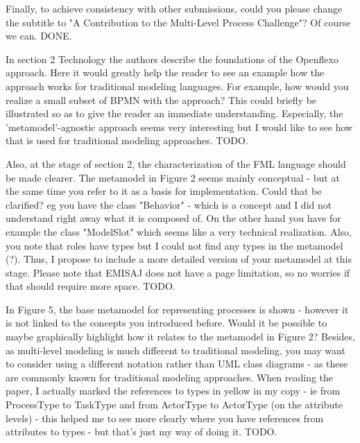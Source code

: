 \documentclass[10pt]{article}
\begin{document}
\begin{response}{Finally, to achieve consistency with other submissions, could you please change the subtitle to "A Contribution to the Multi-Level Process Challenge"?} Of course we can.
  DONE.
\end{response}

\pagebreak

\begin{response}{In section 2 Technology the authors describe the foundations of the Openflexo approach. Here it would greatly help the reader to see an example how the approach works for traditional modeling languages. For example, how would you realize a small subset of BPMN with the approach? This could briefly be illustrated so as to give the reader an immediate understanding. Especially, the 'metamodel'-agnostic approach seems very interesting but I would like to see how that is used for traditional modeling approaches.}
TODO.
\end{response}

\begin{response}{Also, at the stage of section 2, the characterization of the FML language should be made clearer. The metamodel in Figure 2 seems mainly conceptual - but at the same time you refer to it as a basis for implementation. Could that be clarified? eg you have the class "Behavior" - which is a concept and I did not understand right away what it is composed of. On the other hand you have for example the class "ModelSlot" which seems like a very technical realization. Also, you note that roles have types but I could not find any types in the metamodel (?). Thus, I propose to include a more detailed version of your metamodel at this stage. Please note that EMISAJ does not have a page limitation, so no worries if that should require more space.} 
TODO.
\end{response}

\begin{response}{In Figure 5, the base metamodel for representing processes is shown - however it is not linked to the concepts you introduced before. Would it be possible to maybe graphically highlight how it relates to the metamodel in Figure 2? Besides, as multi-level modeling is much different to traditional modeling, you may want to consider using a different notation rather than UML class diagrams - as these are commonly known for traditional modeling approaches. When reading the paper, I actually marked the references to types in yellow in my copy - ie from ProcessType to TaskType and from ActorType to ActorType (on the attribute levels) - this helped me to see more clearly where you have references from attributes to types - but that's just my way of doing it.} 
TODO.
\end{response}
\end{document}
